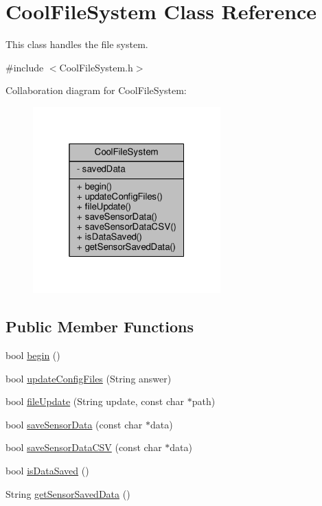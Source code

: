 \hypertarget{classCoolFileSystem}{}\section{Cool\+File\+System Class Reference}
\label{classCoolFileSystem}


This class handles the file system.  




{\ttfamily \#include $<$Cool\+File\+System.\+h$>$}



Collaboration diagram for Cool\+File\+System\+:\nopagebreak
\begin{figure}[H]
\begin{center}
\leavevmode
\includegraphics[width=205pt]{classCoolFileSystem__coll__graph}
\end{center}
\end{figure}
\subsection*{Public Member Functions}
\begin{DoxyCompactItemize}
\item 
bool \hyperlink{classCoolFileSystem_a6ba6f666ed4c530174f8569d2c636748}{begin} ()
\item 
bool \hyperlink{classCoolFileSystem_adfa8e2e80641ae6f0cceabd348a9b841}{update\+Config\+Files} (String answer)
\item 
bool \hyperlink{classCoolFileSystem_a13f2958f5b87757c31fc53797a30d23a}{file\+Update} (String update, const char $\ast$path)
\item 
bool \hyperlink{classCoolFileSystem_afa3a4feae94871d4d3b6bebb701c2e67}{save\+Sensor\+Data} (const char $\ast$data)
\item 
bool \hyperlink{classCoolFileSystem_ab78704d5d21ce10fc6f1138ab5ab46c8}{save\+Sensor\+Data\+C\+SV} (const char $\ast$data)
\item 
bool \hyperlink{classCoolFileSystem_a5a7eaeea7a9fbf8aaef651d862fa3b5b}{is\+Data\+Saved} ()
\item 
String \hyperlink{classCoolFileSystem_a5c58bca3735c0ed3efb268d70ef998ef}{get\+Sensor\+Saved\+Data} ()
\end{DoxyCompactItemize}
